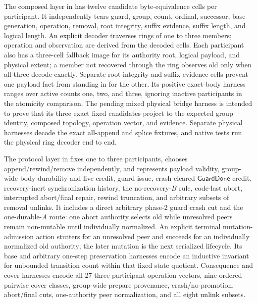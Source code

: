 \documentclass[10pt,twocolumn]{article}
\theoremstyle{remark}
\begin{document}
The composed layer in  has twelve candidate byte-equivalence cells per
participant. It independently tears guard, group, count, ordinal, successor, base generation,
operation, removal, root integrity, suffix evidence, suffix length, and logical length. An explicit
decoder traverses rings of one to three members; operation and observation are derived from the
decoded cells. Each participant also has a three-cell fallback image for its authority root,
logical payload, and physical extent; a member not recovered through the ring observes old only
when all three decode exactly. Separate root-integrity and suffix-evidence cells prevent one payload
fact from standing in for the other. Its positive exact-body harness ranges over active counts one,
two, and three, ignoring inactive participants in the atomicity comparison. The pending mixed
physical bridge harness is intended to prove that its three exact fixed candidates project to the
expected group identity, composed topology, operation vector, and evidence. Separate
physical harnesses decode the exact all-append and splice fixtures, and native tests run the
physical ring decoder end to end.

The protocol layer in  fixes one to three participants, chooses
append/rewind/remove independently, and represents payload validity, group-wide body durability and
live credit, guard issue, crash-cleared $\mathsf{GuardDone}$ credit, recovery-inert synchronization
history, the no-recovery-$B$ rule, code-last abort, interrupted abort/final repair, rewind
truncation, and arbitrary subsets of removal unlinks. It includes a direct arbitrary phase-2 guard
crash cut and the one-durable-$A$ route: one abort authority selects old while unresolved peers
remain non-mutable until individually normalized. An explicit terminal mutation-admission action
stutters for an unresolved peer and succeeds for an individually normalized old authority; the
later mutation is the next serialized lifecycle. Its base and arbitrary one-step preservation
harnesses encode an inductive invariant for unbounded transition count within that fixed state
quotient. Consequence and cover harnesses encode all 27 three-participant operation vectors, nine
ordered pairwise cover classes, group-wide prepare provenance, crash/no-promotion, abort/final cuts,
one-authority peer normalization, and all eight unlink subsets.
\end{document}
